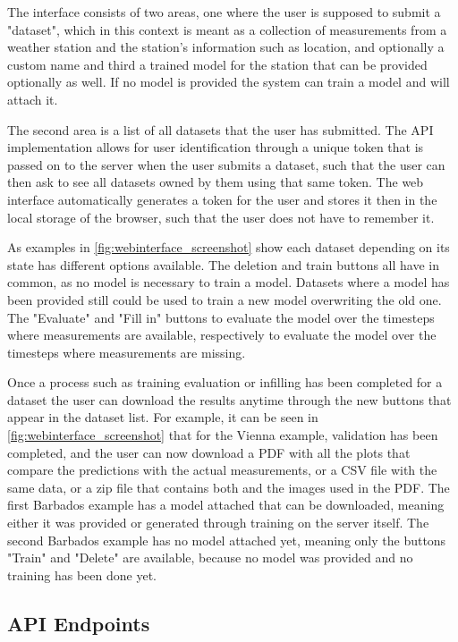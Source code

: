 The interface consists of two areas, one where the user is supposed to submit a "dataset", which in this context is meant as a collection of measurements from a weather station and the station's information such as location, and optionally a custom name and third a trained model for the station that can be provided optionally as well. If no model is provided the system can train a model and will attach it. 

The second area is a list of all datasets that the user has submitted. The API implementation allows for user identification through a unique token that is passed on to the server when the user submits a dataset, such that the user can then ask to see all datasets owned by them using that same token. The web interface automatically generates a token for the user and stores it then in the local storage of the browser, such that the user does not have to remember it.

As examples in \autoref{fig:webinterface_screenshot} show each dataset depending on its state has different options available. The deletion and train buttons all have in common, as no model is necessary to train a model. Datasets where a model has been provided still could be used to train a new model overwriting the old one. The "Evaluate" and "Fill in" buttons to evaluate the model over the timesteps where measurements are available, respectively to evaluate the model over the timesteps where measurements are missing.

Once a process such as training evaluation or infilling has been completed for a dataset the user can download the results anytime through the new buttons that appear in the dataset list. For example, it can be seen in \autoref{fig:webinterface_screenshot} that for the Vienna example, validation has been completed, and the user can now download a PDF with all the plots that compare the predictions with the actual measurements, or a CSV file with the same data, or a zip file that contains both and the images used in the PDF. The first Barbados example has a model attached that can be downloaded, meaning either it was provided or generated through training on the server itself. The second Barbados example has no model attached yet, meaning only the buttons "Train" and "Delete" are available, because no model was provided and no training has been done yet. 


\subsection{API Endpoints}
\label{sec:api}

